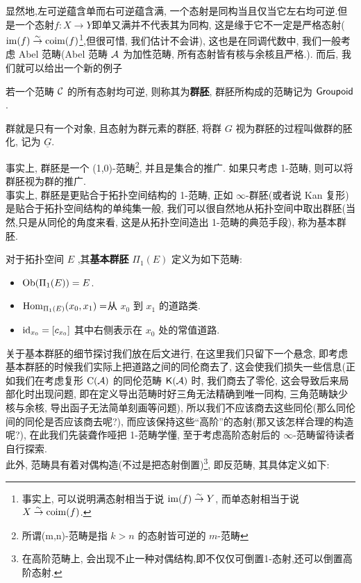 显然地,左可逆蕴含单而右可逆蕴含满, 一个态射是同构当且仅当它左右均可逆.但是一个态射$f: X \to Y$即单又满并不代表其为同构, 这是缘于它不一定是严格态射($\operatorname{im}(f)\stackrel{\sim}{\rightarrow} \operatorname{coim}(f)$\footnote{事实上, 可以说明满态射相当于说 $\operatorname{im}(f) \stackrel{\sim}{\rightarrow} Y$, 而单态射相当于说 $X \stackrel{\sim}{\rightarrow} \operatorname{coim}(f)$.},但很可惜, 我们估计不会讲), 这也是在同调代数中, 我们一般考虑 Abel 范畴(Abel 范畴 $\cal{A}$ 为加性范畴, 所有态射皆有核与余核且严格.).
而后, 我们就可以给出一个新的例子
\begin{definition}[群胚]
    若一个范畴 $\cal{C}$ 的所有态射均可逆, 则称其为\textbf{群胚}, 群胚所构成的范畴记为 $\mathsf{Groupoid}$.
\end{definition}
\begin{example}
    群就是只有一个对象, 且态射为群元素的群胚, 将群 $G$ 视为群胚的过程叫做群的胚化, 记为 $\underline{G}$.
\end{example}
事实上, 群胚是一个 (1,0)-范畴\footnote{所谓(m,n)-范畴是指 $k>n$ 的态射皆可逆的 $m$-范畴}, 并且是集合的推广. 如果只考虑 1-范畴, 则可以将群胚视为群的推广.\\
事实上, 群胚是更贴合于拓扑空间结构的 1-范畴, 正如 $\infty$-群胚(或者说 Kan 复形)是贴合于拓扑空间结构的单纯集一般, 我们可以很自然地从拓扑空间中取出群胚(当然,只是从同伦的角度来看, 这是从拓扑空间造出 1-范畴的典范手段), 称为基本群胚.
\begin{example}
    对于拓扑空间 $E$ ,其\textbf{基本群胚} $\Pi_{1}(E)$ 定义为如下范畴:
    \begin{itemize}
        \item $\operatorname{Ob}(\Pi_1(E)) = E$.
        \item $\operatorname{Hom}_{\Pi_1(E)}(x_0,x_1) = $从 $x_0$ 到 $x_1$ 的道路类.
        \item $\mathrm{id}_{x_0} = [c_{x_0}]$ 其中右侧表示在 $x_0$ 处的常值道路.
    \end{itemize}
\end{example}
关于基本群胚的细节探讨我们放在后文进行, 在这里我们只留下一个悬念, 即考虑基本群胚的时候我们实际上把道路之间的同伦商去了, 这会使我们损失一些信息(正如我们在考虑复形 $\operatorname{C}(\cal{A})$ 的同伦范畴 $\mathsf{K}(\cal{A})$ 时, 我们商去了零伦, 这会导致后来局部化时出现问题, 即在定义导出范畴时好三角无法精确到唯一同构, 三角范畴缺少核与余核, 导出函子无法简单刻画等问题), 所以我们不应该商去这些同伦(那么同伦间的同伦是否应该商去呢?), 而应该保持这些``高阶''的态射(那又该怎样合理的构造呢?), 在此我们先装聋作哑把 1-范畴学懂, 至于考虑高阶态射后的 $\infty$-范畴留待读者自行探索.\\
此外, 范畴具有着对偶构造(不过是把态射倒置)\footnote{在高阶范畴上, 会出现不止一种对偶结构,即不仅仅可倒置1-态射,还可以倒置高阶态射.}, 即反范畴, 其具体定义如下:
